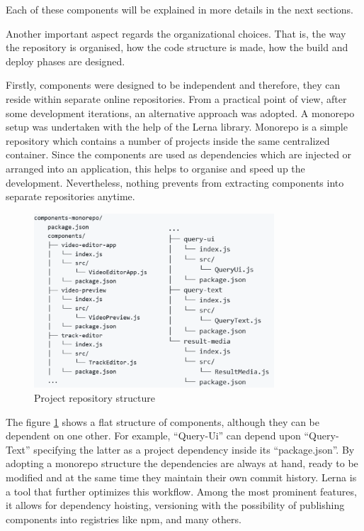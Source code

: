 Each of these components will be explained in more details in the next sections. 

Another important aspect regards the organizational choices. That is, the way the repository is organised, how the code structure is made, how the build and deploy phases are designed.

Firstly, components were designed to be independent and therefore, they can reside within separate online repositories. From a practical point of view, after some development iterations, an alternative approach was adopted. A monorepo setup was undertaken with the help of the Lerna library. Monorepo is a simple repository which contains a number of projects inside the same centralized container. Since the components are used as dependencies which are injected or arranged into an application, this helps to organise and speed up the development. Nevertheless, nothing prevents from extracting components into separate repositories anytime.

\begin{figure}[H]
\centering
\includegraphics[width=0.8\textwidth]{images/repository.png}
\caption{Project repository structure}
\label{fig:repoStructure}
\end{figure}

The figure \ref{fig:repoStructure} shows a flat structure of components, although they can be dependent on one other. For example, “Query-Ui” can depend upon “Query-Text” specifying the latter as a project dependency inside its “package.json”. By adopting a monorepo structure the dependencies are always at hand, ready to be modified and at the same time they maintain their own commit history. Lerna is a tool that further optimizes this workflow. Among the most prominent features, it allows for dependency hoisting, versioning with the possibility of publishing components into registries like npm, and many others.

